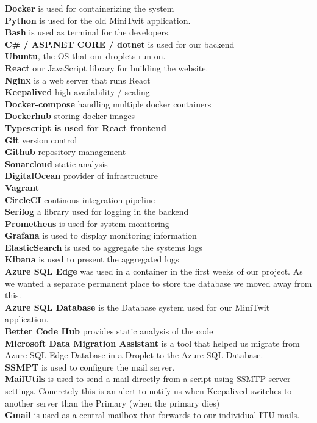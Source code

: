 \textbf{Docker} is used for containerizing the system \\
\textbf{Python} is used for the old MiniTwit application. \\
\textbf{Bash} is used as terminal for the developers. \\
\textbf{C\# / ASP.NET CORE / dotnet} is used for our backend \\
\textbf{Ubuntu}, the OS that our droplets run on.\\
\textbf{React} our JavaScript library for building the website. \\
\textbf{Nginx} is a web server that runs React\\
\textbf{Keepalived} high-availability / scaling \\
\textbf{Docker-compose} handling multiple docker containers \\
\textbf{Dockerhub} storing docker images \\
\textbf{Typescript is used for React frontend} \\
\textbf{Git} version control \\
\textbf{Github} repository management \\
\textbf{Sonarcloud} static analysis \\
\textbf{DigitalOcean} provider of infrastructure \\
\textbf{Vagrant} \\
\textbf{CircleCI} continous integration pipeline \\
\textbf{Serilog} a library used for logging in the backend \\
\textbf{Prometheus} is used for system monitoring \\
\textbf{Grafana} is used to display monitoring information \\
\textbf{ElasticSearch} is used to aggregate the systems logs \\
\textbf{Kibana} is used to present the aggregated logs \\
\textbf{Azure SQL Edge} was used in a container in the first weeks of our project. As we wanted a separate permanent place to store the database we moved away from this.\\
\textbf{Azure SQL Database} is the Database system used for our MiniTwit application.\\
\textbf{Better Code Hub} provides static analysis of the code \\
\textbf{Microsoft Data Migration Assistant} is a tool that helped us migrate from Azure SQL Edge Database in a Droplet to the Azure SQL Database.\\
\textbf{SSMPT} is used to configure the mail server.\\
\textbf{MailUtils} is used to send a mail directly from a script using SSMTP server settings. Concretely this is an alert to notify us when Keepalived switches to another server than the Primary (when the primary dies)\\
\textbf{Gmail} is used as a central mailbox that forwards to our individual ITU mails.\\



